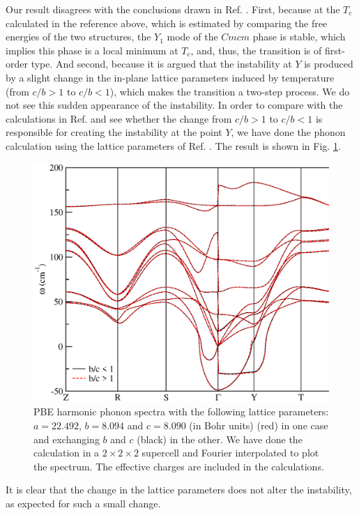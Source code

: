Our result disagrees with the conclusions drawn in Ref. \cite{dewandre2016two}.
First, because at the $T_{c}$ calculated in the reference above, which is estimated by comparing the free energies 
of the two structures, the $Y_{1}$ mode of the $Cmcm$ phase is stable, which implies this phase is a local minimum 
at $T_{c}$, and, thus, the transition is of first-order type. And second, because it is argued that the instability 
at $Y$ is produced by a slight change in the in-plane lattice parameters induced by temperature (from $c/b>1$ to 
$c/b<1$), which makes the transition a two-step process. We do not see this sudden appearance of the instability. 
In order to compare with the calculations in Ref. \cite{dewandre2016two} and see whether the change from $c/b>1$ to
$c/b<1$ is responsible for creating the instability at the point $Y$, we have done the phonon calculation using the
lattice parameters of Ref. \cite{dewandre2016two}. The result is shown in Fig. \ref{exchangebc}.
\begin{figure}[th]
\begin{center}
\includegraphics[width=0.9\linewidth]{Figures/exchangebc-harmonic.eps}
\caption[Harmonic phonons of $Cmcm$ SnSe exchanging the $b$ and $c$ lattice parameters.]{PBE harmonic phonon spectra with the following lattice parameters: $a=22.492$, $b=8.094$ and $c=8.090$ (in
Bohr units) (red) in one case and exchanging $b$ and $c$ (black) in the other. We have done the calculation in a
$2\times2\times2$ supercell and Fourier interpolated to plot the spectrum. The effective charges are included in the
calculations.}
\label{exchangebc}
\end{center}
\end{figure}
It is clear that the change in the lattice parameters does not alter the instability, as expected for such a small
change. \\

